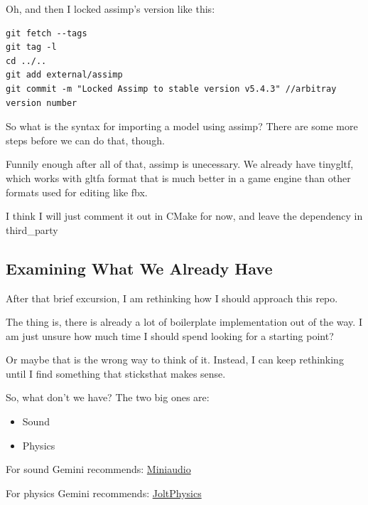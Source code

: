 \documentclass{article}
\begin{document}
\par Oh, and then I locked assimp's version like this:
\begin{verbatim}
git fetch --tags
git tag -l
cd ../..
git add external/assimp
git commit -m "Locked Assimp to stable version v5.4.3" //arbitray version number
\end{verbatim}

\par So what is the syntax for importing a model using assimp? There
are some more steps before we can do that, though.

\par Funnily enough after all of that, assimp is unecessary. We
already have tinygltf, which works with gltf\textemdash a format that
is much better in a game engine than other formats used for editing like fbx.

\par I think I will just comment it out in CMake for now, and leave
the dependency in third\_party


\subsection*{Examining What We Already
Have}
\par After that brief excursion, I am rethinking how I should
approach this repo.

\par The thing is, there is already a lot of boilerplate
implementation out of the way. I am just unsure how much time I
should spend looking for a starting point?

\par Or maybe that is the wrong way to think of it. Instead, I can
keep rethinking until I find something that sticks\textemdash that makes sense.

\par So, what don't we have? The two big ones are:
\begin{itemize}
\item Sound
\item Physics
\end{itemize}

\par For sound Gemini recommends:
\href{https://github.com/mackron/miniaudio}{Miniaudio}
\par For physics Gemini recommends:
\href{https://github.com/jrouwe/JoltPhysics}{JoltPhysics}
\end{document}
